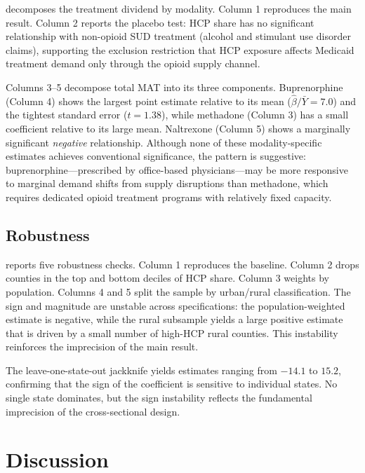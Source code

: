 \documentclass[12pt]{article}
\begin{document}
 decomposes the treatment dividend by modality. Column 1 reproduces the main result. Column 2 reports the placebo test: HCP share has no significant relationship with non-opioid SUD treatment (alcohol and stimulant use disorder claims), supporting the exclusion restriction that HCP exposure affects Medicaid treatment demand only through the opioid supply channel.

Columns 3--5 decompose total MAT into its three components. Buprenorphine (Column 4) shows the largest point estimate relative to its mean ($\hat{\beta}/\bar{Y} = 7.0$) and the tightest standard error ($t = 1.38$), while methadone (Column 3) has a small coefficient relative to its large mean. Naltrexone (Column 5) shows a marginally significant \textit{negative} relationship. Although none of these modality-specific estimates achieves conventional significance, the pattern is suggestive: buprenorphine---prescribed by office-based physicians---may be more responsive to marginal demand shifts from supply disruptions than methadone, which requires dedicated opioid treatment programs with relatively fixed capacity.



\subsection{Robustness}

 reports five robustness checks. Column 1 reproduces the baseline. Column 2 drops counties in the top and bottom deciles of HCP share. Column 3 weights by population. Columns 4 and 5 split the sample by urban/rural classification. The sign and magnitude are unstable across specifications: the population-weighted estimate is negative, while the rural subsample yields a large positive estimate that is driven by a small number of high-HCP rural counties. This instability reinforces the imprecision of the main result.

The leave-one-state-out jackknife yields estimates ranging from $-14.1$ to $15.2$, confirming that the sign of the coefficient is sensitive to individual states. No single state dominates, but the sign instability reflects the fundamental imprecision of the cross-sectional design.



\section{Discussion}
\end{document}
